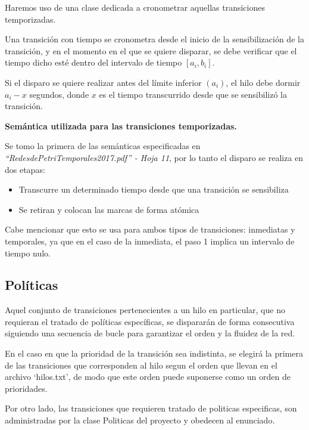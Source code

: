 \documentclass[12pt,a4paper]{article}
\begin{document}
Haremos uso de una clase dedicada a cronometrar aquellas transiciones temporizadas. 

Una transición con tiempo se cronometra desde el inicio de la sensibilización de la transición, y en el momento en el que se quiere disparar, se debe verificar que el tiempo dicho esté dentro del intervalo de tiempo $[a_i , b_i]$.

Si el disparo se quiere realizar antes del límite inferior $(a_i)$, el hilo debe dormir $a_i-x$ segundos, donde $x$ es el tiempo transcurrido desde que se sensibilizó la transición.

\textbf{Semántica utilizada para las transiciones temporizadas.}

Se tomo la primera de las semánticas especificadas en \textit{“Redes\textunderscore de\textunderscore  Petri\textunderscore Temporales\textunderscore 2017.pdf” - Hoja 11}, por lo tanto el disparo se realiza en dos etapas:
\begin{itemize}
    \item Transcurre un determinado tiempo desde que una transición se sensibiliza
    \item Se retiran y colocan las marcas de forma atómica
\end{itemize}
Cabe mencionar que esto se usa para ambos tipos de transiciones: inmediatas y temporales, ya que en el caso de la inmediata, el paso 1 implica un intervalo de tiempo nulo.

\subsection{Políticas}
Aquel conjunto de transiciones pertenecientes a un hilo en particular, que no requieran el tratado de políticas específicas, se dispararán de forma consecutiva siguiendo una secuencia de bucle para garantizar el orden y la fluidez de la red.

En el caso en que la prioridad de la transición sea indistinta, se elegirá la primera de las transiciones que corresponden al hilo segun el orden que llevan en el archivo ‘hilos.txt’, de modo que este orden puede suponerse como un orden de prioridades.

Por otro lado, las transiciones que requieren tratado de politicas especificas, son administradas por la clase Politicas del proyecto y obedecen al enunciado.
\end{document}
